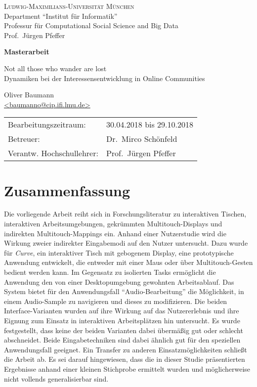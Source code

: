 \pagestyle{empty} %

\begin{center}
\textsc{Ludwig-Maximilians-Universität München}\\
Department ``Institut für Informatik''\\
Professur für Computational Social Science and Big Data\\
Prof.\ Jürgen Pfeffer

\vspace{4.75cm}
{\large\textbf{Masterarbeit}}\vspace{.5cm}

{\Huge{}Not all those who wander are lost}\\\vspace{.5cm}
{\Large{}Dynamiken bei der Interessensentwicklung in Online Communities}\vspace{.75cm}

{\large Oliver Baumann}\\\href{mailto:baumanno@cip.ifi.lmu.de}{<baumanno@cip.ifi.lmu.de>}

\end{center}
\vfill

\begin{tabular}{ll}
Bearbeitungszeitraum: & 30.04.2018 bis 29.10.2018\\
Betreuer: & Dr.\ Mirco Schönfeld\\
Verantw. Hochschullehrer: & Prof.\ Jürgen Pfeffer
\end{tabular}


\clearpage
\section*{Zusammenfassung}

Die vorliegende Arbeit reiht sich in Forschungsliteratur zu interaktiven Tischen, interaktiven Arbeitsumgebungen,
gekrümmten Multitouch-Displays und indirekten Multitouch-Mappings ein. Anhand einer Nutzerstudie wird die Wirkung zweier indirekter
Eingabemodi auf den Nutzer untersucht. Dazu wurde für \emph{Curve}, ein interaktiver Tisch mit gebogenem Display,
eine prototypische Anwendung entwickelt, die entweder mit einer Maus oder über Multitouch-Gesten bedient werden kann.
Im Gegensatz zu isolierten Tasks ermöglicht die Anwendung den von einer Desktopumgebung gewohnten Arbeitsablauf. Das System
bietet für den Anwendungsfall "`Audio-Bearbeitung"' die Möglichkeit, in einem Audio-Sample zu navigieren und dieses
zu modifizieren. Die beiden Interface-Varianten wurden auf ihre Wirkung auf das Nutzererlebnis und ihre Eignung
zum Einsatz in interaktiven Arbeitsplätzen hin untersucht. Es wurde festgestellt, dass keine der beiden Varianten
dabei übermäßig gut oder schlecht abschneidet. Beide Eingabetechniken sind dabei ähnlich gut für den speziellen
Anwendungsfall geeignet. Ein Transfer zu anderen Einsatzmöglichkeiten schließt die Arbeit ab. Es sei darauf hingewiesen,
dass die in dieser Studie präsentierten Ergebnisse anhand einer kleinen Stichprobe ermittelt wurden und möglicherweise
nicht vollends generalisierbar sind.

